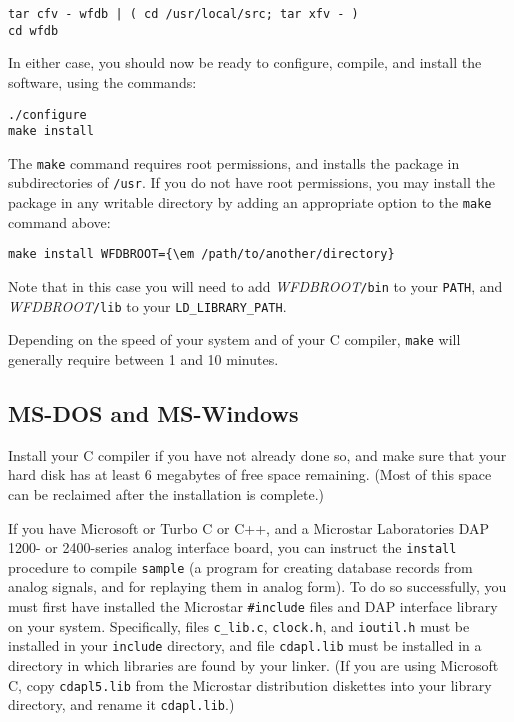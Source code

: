 \documentclass[twoside]{article}
\begin{document}
\begin{verbatim}
tar cfv - wfdb | ( cd /usr/local/src; tar xfv - )
cd wfdb
\end{verbatim}

In either case, you should now be ready to configure, compile, and install
the software, using the commands:

\begin{verbatim}
./configure
make install
\end{verbatim}

The {\tt make} command requires root permissions, and installs the package
in subdirectories of {\tt /usr}.  If you do not have root permissions,
you may install the package in any writable directory by adding an
appropriate option to the {\tt make} command above:

\begin{verbatim}
make install WFDBROOT={\em /path/to/another/directory}
\end{verbatim}

Note that in this case you will need to add {\em WFDBROOT}{\tt /bin}
to your {\tt PATH}, and {\em WFDBROOT}{\tt /lib} to your
{\tt LD\_LIBRARY\_PATH}.

Depending on the speed of your system and of your C compiler, {\tt make} will
generally require between 1 and 10 minutes.

\subsection*{MS-DOS and MS-Windows}

Install your C compiler if you have not already done so, and make sure that
your hard disk has at least 6 megabytes of free space remaining.  (Most of
this space can be reclaimed after the installation is complete.)

If you have Microsoft or Turbo C or C++, and a Microstar Laboratories DAP 1200-
or 2400-series analog interface board, you can instruct the {\tt install}
procedure to compile {\tt sample} (a program for creating database records
from analog signals, and for replaying them in analog form).  To do so
successfully, you must first have installed the Microstar {\tt \#include} files
and DAP interface library on your system.  Specifically, files {\tt c\_lib.c},
{\tt clock.h}, and {\tt ioutil.h} must be installed in your {\tt include}
directory, and file {\tt cdapl.lib} must be installed in a directory in which
libraries are found by your linker.  (If you are using Microsoft C, copy
{\tt cdapl5.lib} from the Microstar distribution diskettes into your library
directory, and rename it {\tt cdapl.lib}.)
\end{document}
